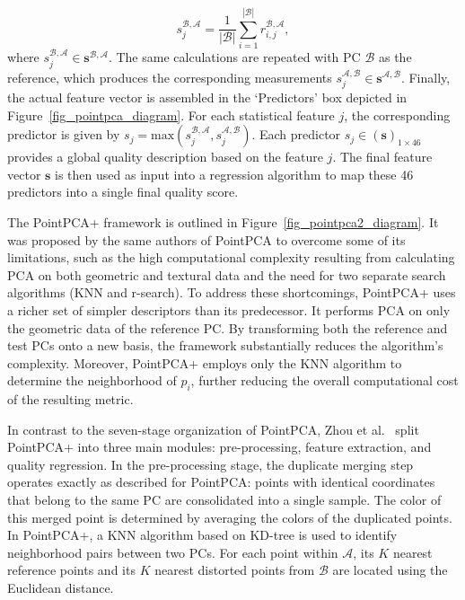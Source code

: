 \documentclass[final,3p,times,twocolumn]{elsarticle}
\begin{document}
\begin{equation} \label{eq_pooling_poinpca}
    s_j^{\mathcal{B},\mathcal{A}} = \frac{1}{|\mathcal{B}|} \sum_{i=1}^{|\mathcal{B}|} r_{i,j}^{\mathcal{B},\mathcal{A}},
\end{equation}
where $s_j^{\mathcal{B},\mathcal{A}} \in \mathbf{s}^{\mathcal{B}, \mathcal{A}}$. The same calculations are repeated with \gls{PC} $\mathcal{B}$ as the reference, which produces the corresponding measurements $s_j^{\mathcal{A}, \mathcal{B}} \in \mathbf{s}^{\mathcal{A}, \mathcal{B}}$. Finally, the actual feature vector is assembled in the `Predictors' box depicted in Figure~\ref{fig_pointpca_diagram}. For each statistical feature $j$, the corresponding predictor is given by $s_j=\text{max}(s_j^{\mathcal{B},\mathcal{A}}, s_j^{\mathcal{A},\mathcal{B}})$. 
Each predictor $s_j \in \left(\mathbf{s}\right)_{1 \times 46}$ provides a global quality description based on the feature $j$. The final feature vector $\mathbf{s}$ is then used as input into a regression algorithm to map these 46 predictors into a single final quality score. 


The PointPCA+ framework is outlined in Figure~\ref{fig_pointpca2_diagram}. It was proposed by the same authors of PointPCA to overcome some of its limitations, such as the high computational complexity resulting from calculating \gls{PCA} on both geometric and textural data and the need for two separate search algorithms (\gls{KNN} and \gls{r-search}). To address these shortcomings, PointPCA+ uses a richer set of simpler descriptors than its predecessor. It performs \gls{PCA} on only the geometric data of the reference \gls{PC}. By transforming both the reference and test \glspl{PC} onto a new basis, the framework substantially reduces the algorithm's complexity. Moreover, PointPCA+ employs only the \gls{KNN} algorithm to determine the neighborhood of $p_i$, further reducing the overall computational cost of the resulting metric.

In contrast to the seven-stage organization of PointPCA, Zhou et al.~\cite{zhou2025pointpca+} split PointPCA+ into three main modules: pre-processing, feature extraction, and quality regression. In the pre-processing stage, the duplicate merging step operates exactly as described for PointPCA: points with identical coordinates that belong to the same \gls{PC} are consolidated into a single sample. The color of this merged point is determined by averaging the colors of the duplicated points. In PointPCA+, a \gls{KNN} algorithm based on \gls{KD-tree} is used to identify neighborhood pairs between two \glspl{PC}. For each point within $\mathcal{A}$, its $K$ nearest reference points and its $K$ nearest distorted points from $\mathcal{B}$ are located using the Euclidean distance. 
\end{document}
